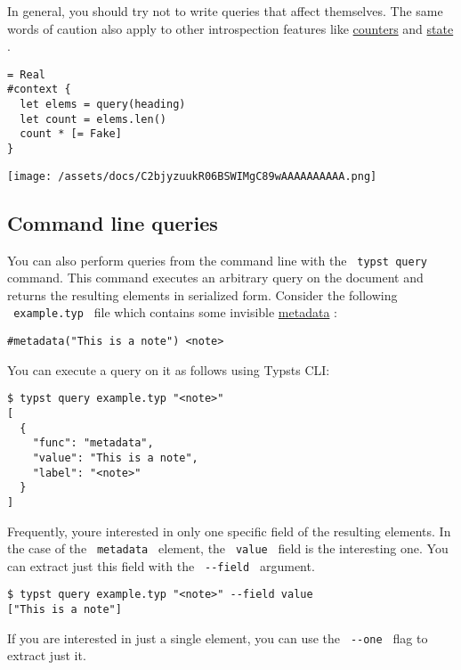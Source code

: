 In general, you should try not to write queries that affect themselves.
The same words of caution also apply to other introspection features
like \href{/docs/reference/introspection/counter/}{counters} and
\href{/docs/reference/introspection/state/}{state} .

\begin{verbatim}
= Real
#context {
  let elems = query(heading)
  let count = elems.len()
  count * [= Fake]
}
\end{verbatim}

\texttt{[image: /assets/docs/C2bjyzuukR06BSWIMgC89wAAAAAAAAAA.png]}

\subsection{Command line queries}\label{command-line-queries}

You can also perform queries from the command line with the
\texttt{\ typst\ query\ } command. This command executes an arbitrary
query on the document and returns the resulting elements in serialized
form. Consider the following \texttt{\ example.typ\ } file which
contains some invisible
\href{/docs/reference/introspection/metadata/}{metadata} :

\begin{verbatim}
#metadata("This is a note") <note>
\end{verbatim}

You can execute a query on it as follows using Typst\textquotesingle s
CLI:

\begin{verbatim}
$ typst query example.typ "<note>"
[
  {
    "func": "metadata",
    "value": "This is a note",
    "label": "<note>"
  }
]
\end{verbatim}

Frequently, you\textquotesingle re interested in only one specific field
of the resulting elements. In the case of the \texttt{\ metadata\ }
element, the \texttt{\ value\ } field is the interesting one. You can
extract just this field with the \texttt{\ -\/-field\ } argument.

\begin{verbatim}
$ typst query example.typ "<note>" --field value
["This is a note"]
\end{verbatim}

If you are interested in just a single element, you can use the
\texttt{\ -\/-one\ } flag to extract just it.

